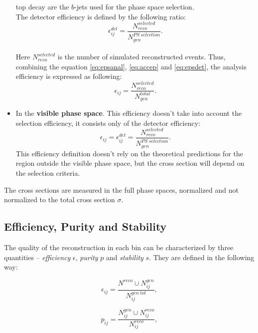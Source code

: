 \begin{itemize}
 top decay are the $b$-jets used for the phase space selection.
 \\
 The detector efficiency is defined by the following ratio:
 \\
 \begin{equation}\label{eq:epsdet}
  \epsilon_{ij}^{det} = \frac{N^{selected}_{reco}}{N^{PS\;selection}_{gen}}.
 \end{equation}
 \\
 Here $N^{selected}_{reco}$ is the number of simulated reconstructed events. Thus, combining the equation \ref{eq:epsanal}, \ref{eq:accep} and \ref{eq:epsdet},
 the analysis efficiency is expressed as following:
 \\
 \begin{equation}
  \epsilon_{ij} = \frac{N^{selected}_{reco}}{N^{total}_{gen}}.
 \end{equation}
 
 \item In the \textbf{visible phase space}. This efficiency doesn't take into account the selection efficiency, it consists only of the detector efficiency:
 \begin{equation}
  \epsilon_{ij} = \epsilon_{ij}^{det} = \frac{N^{selected}_{reco}}{N^{PS\;selection}_{gen}}.
 \end{equation}
 This efficiency definition doesn't rely on the theoretical predictions for the region outside the visible phase space, but the cross section will depend on
 the selection criteria.
\end{itemize}

The cross sections are measured in the full phase spaces, normalized and not normalized to the total cross section $\sigma$. 

\subsection{Efficiency, Purity and Stability}\label{ssec:EPS}

The quality of the reconstruction in each bin can be characterized by three quantities -- \textit{efficiency} $\epsilon$, \textit{purity} $p$ and
\textit{stability} $s$. They are defined in the following way:

\begin{equation}
 \epsilon_{ij} = \frac{N^{reco} \cup N_{ij}^{gen}}{N_{ij}^{gen\:tot}},
\end{equation}

\begin{equation}
 p_{ij} = \frac{N_{ij}^{gen} \cup N_{ij}^{reco}}{N_{ij}^{reco}},
\end{equation}

